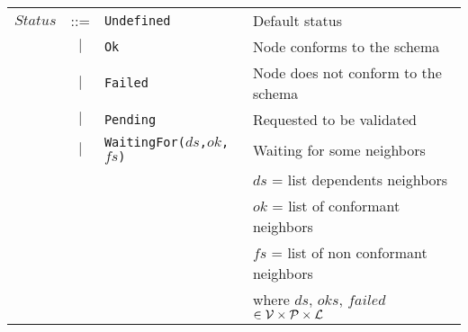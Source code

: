 \begin{tabular}{ccll}
    $Status$ & ::=    & \texttt{Undefined}                  & Default status                                                         \\
             & $\mid$ & \texttt{Ok}                         & Node conforms to the schema                                            \\
             & $\mid$ & \texttt{Failed}                     & Node does not conform to the schema                                    \\
             & $\mid$ & \texttt{Pending}                    & Requested to be validated                                              \\
             & $\mid$ & \texttt{WaitingFor($ds$,$ok$,$fs$)} & Waiting for some neighbors                                             \\
             &        &                                     & $ds$ = list dependents neighbors                                       \\
             &        &                                     & $ok$ = list of conformant neighbors                                    \\
             &        &                                     & $fs$ = list of non conformant neighbors                                \\
             &        &                                     & where $ds$, $oks$, $failed$ $\in\mathcal{V}\times\mathcal{P}\times\mathcal{L}$
\end{tabular}